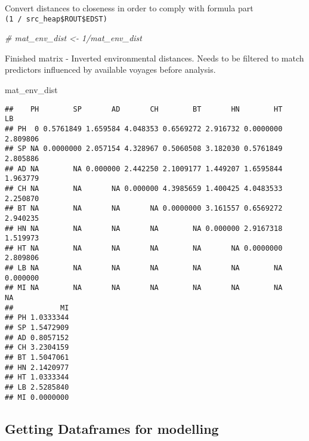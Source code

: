 \documentclass[]{article}
\newenvironment{Shaded}{\begin{snugshade}}{\end{snugshade}}
\newcommand{\CommentTok}[1]{\textcolor[rgb]{0.56,0.35,0.01}{\textit{#1}}}
\newcommand{\NormalTok}[1]{#1}
\begin{document}
Convert distances to closeness in order to comply with formula part
\texttt{(1\ /\ src\_heap\$ROUT\$EDST)}

\begin{Shaded}
\begin{Highlighting}[]
\CommentTok{# mat_env_dist <- 1/mat_env_dist}
\end{Highlighting}
\end{Shaded}

Finished matrix - Inverted environmental distances. Needs to be filtered
to match predictors influenced by available voyages before analysis.

\begin{Shaded}
\begin{Highlighting}[]
\NormalTok{mat_env_dist}
\end{Highlighting}
\end{Shaded}

\begin{verbatim}
##    PH        SP       AD       CH        BT       HN        HT       LB
## PH  0 0.5761849 1.659584 4.048353 0.6569272 2.916732 0.0000000 2.809806
## SP NA 0.0000000 2.057154 4.328967 0.5060508 3.182030 0.5761849 2.805886
## AD NA        NA 0.000000 2.442250 2.1009177 1.449207 1.6595844 1.963779
## CH NA        NA       NA 0.000000 4.3985659 1.400425 4.0483533 2.250870
## BT NA        NA       NA       NA 0.0000000 3.161557 0.6569272 2.940235
## HN NA        NA       NA       NA        NA 0.000000 2.9167318 1.519973
## HT NA        NA       NA       NA        NA       NA 0.0000000 2.809806
## LB NA        NA       NA       NA        NA       NA        NA 0.000000
## MI NA        NA       NA       NA        NA       NA        NA       NA
##           MI
## PH 1.0333344
## SP 1.5472909
## AD 0.8057152
## CH 3.2304159
## BT 1.5047061
## HN 2.1420977
## HT 1.0333344
## LB 2.5285840
## MI 0.0000000
\end{verbatim}

\subsection{Getting Dataframes for
modelling}\label{getting-dataframes-for-modelling}
\end{document}

